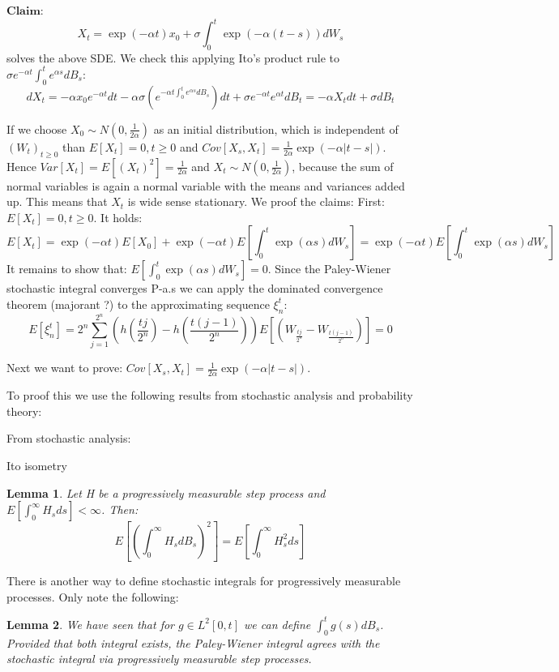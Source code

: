 \documentclass[%
thesis=student,%
coverpage=false,%
titlepage=false,%
headmarks=true, %
german,%
font=libertine, %
math=newpxtx, %
BCOR=5mm,%
coverBCOR=11mm%
]{tumbook}
\newtheorem{lemma}{Lemma}
\begin{document}
$\textbf{Claim}$: 
\[
X_{t} = \exp(-\alpha t)x_{0} + \sigma\int_{0}^{t}\exp(-\alpha (t-s))dW_{s}
\]
solves the above SDE. We check this applying Ito's product rule to $\sigma e^{-\alpha t}\int_{0}^{t}e^{\alpha s}dB_{s}$:
\[
dX_{t} = -\alpha x_{0}e^{-\alpha t}dt - \alpha\sigma(e^{-\alpha t \int_{0}^{t}e^{\alpha s}dB_{s}})dt + \sigma e^{-\alpha t}e^{\alpha t}dB_{t} = -\alpha X_{t} dt + \sigma dB_{t}
\]

If we choose $X_{0} \sim N(0,\frac{1}{2\alpha})$ as an initial distribution, which is independent of $(W_{t})_{t\geq 0}$ than $E[X_{t}] = 0, t \geq 0$ and $Cov[X_{s},X_{t}] = \frac{1}{2\alpha}\exp(-\alpha\lvert t-s \rvert)$. Hence $Var[X_{t}]=E[(X_{t})^{2}]=\frac{1}{2\alpha}$ and $X_{t} \sim N(0,\frac{1}{2\alpha})$, because the sum of normal variables is again a normal variable with the means and variances added up. This means that $X_{t}$ is wide sense stationary. We proof the claims:
First: $E[X_{t}] = 0, t \geq 0$. It holds: 
\[
E[X_{t}] = \exp(-\alpha t)E[X_{0}] + \exp(-\alpha t)E[\int_{0}^{t} \exp(\alpha s) dW_{s}] = \exp(-\alpha t)E[\int_{0}^{t} \exp(\alpha s) dW_{s}]
\]
It remains to show that: $E[\int_{0}^{t} \exp(\alpha s) dW_{s}] = 0$.
Since the Paley-Wiener stochastic integral converges P-a.s we can apply the dominated convergence theorem (majorant ?) to the approximating sequence $\xi_{n}^{t}$: 
\[
E[\xi_{n}^{t}] = 2^{n}\sum_{j=1}^{2^{n}}(h(\frac{tj}{2^{n}})-h(\frac{t(j-1)}{2^{n}}))E[(W_{\frac{tj}{2^{n}}}-W_{\frac{t(j-1)}{2^{n}}})] = 0 
\]

Next we want to prove: $Cov[X_{s},X_{t}] = \frac{1}{2\alpha}\exp(-\alpha \lvert t-s \rvert)$. 

To proof this we use the following results from stochastic analysis and probability theory:

From stochastic analysis:

Ito isometry

\begin{lemma}
 Let H be a progressively measurable step process and $E[\int_{0}^{\infty}H_{s}ds]<\infty$. Then:
 \[
 E[(\int_{0}^{\infty}H_{s}dB_{s})^{2}] = E[\int_{0}^{\infty}H_{s}^{2}ds]
 \]
\end{lemma}

There is another way to define stochastic integrals for progressively measurable processes. Only note the following: 

\begin{lemma}
    We have seen that for $g \in L^{2}[0,t]$ we can define $\int_{0}^{t}g(s)dB_{s}$. Provided that both integral exists, the Paley-Wiener integral agrees with the stochastic integral via progressively measurable step processes.
\end{lemma}
\end{document}
